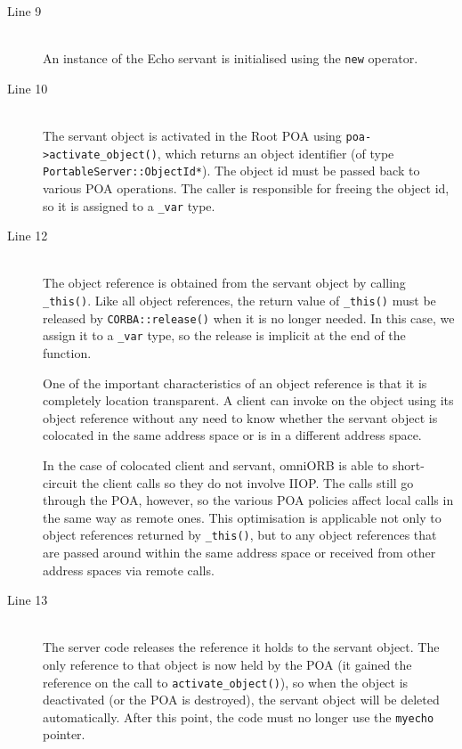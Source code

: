 \documentclass[11pt,twoside,a4paper]{book}
\newcommand{\type}[1]{\texttt{#1}}
\newcommand{\code}[1]{\texttt{#1}}
\newcommand{\op}[1]{\texttt{#1()}}
\newcommand{\dsc}{\discretionary{}{}{}}
\begin{document}
\begin{description}

\item[Line 9]\mbox{}\\
%
An instance of the Echo servant is initialised using the \code{new}
operator.

\item[Line 10]\mbox{}\\
%
The servant object is activated in the Root POA using
\op{poa->activate\_\dsc{}object}, which returns an object identifier
(of type \type{PortableServer::\dsc{}ObjectId*}). The object id must
be passed back to various POA operations. The caller is responsible
for freeing the object id, so it is assigned to a \type{\_var} type.

\item[Line 12]\mbox{}\\
%
The object reference is obtained from the servant object by calling
\op{\_this}. Like all object references, the return value of
\op{\_this} must be released by \op{CORBA::release} when it is no
longer needed. In this case, we assign it to a \type{\_var} type, so
the release is implicit at the end of the function.

One of the important characteristics of an object reference is that it
is completely location transparent. A client can invoke on the object
using its object reference without any need to know whether the
servant object is colocated in the same address space or is in a
different address space.

In the case of colocated client and servant, omniORB is able to
short-circuit the client calls so they do not involve IIOP. The calls
still go through the POA, however, so the various POA policies affect
local calls in the same way as remote ones. This optimisation is
applicable not only to object references returned by \op{\_this}, but
to any object references that are passed around within the same
address space or received from other address spaces via remote calls.

\item[Line 13]\mbox{}\\
%
The server code releases the reference it holds to the servant
object. The only reference to that object is now held by the POA (it
gained the reference on the call to \op{activate\_object}), so when
the object is deactivated (or the POA is destroyed), the servant
object will be deleted automatically. After this point, the code must
no longer use the \code{myecho} pointer.

\end{description}
\end{document}
